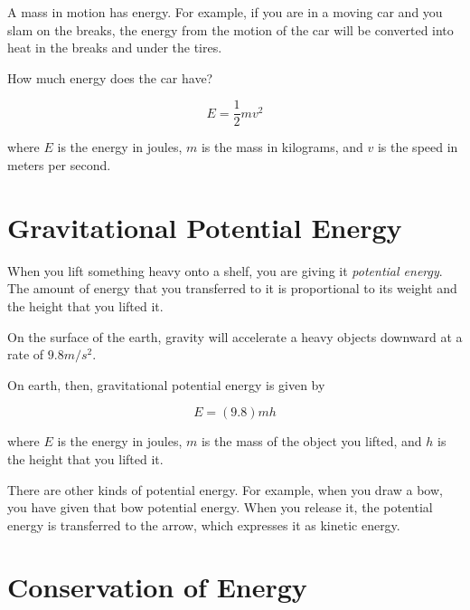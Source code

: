 A mass in motion has energy. For example, if you are in a moving car
and you slam on the breaks, the energy from the motion of the
car will be converted into heat in the breaks and under the tires.

How much energy does the car have?

\begin{mdframed}[style=important, frametitle={Formula for Kinetic Energy}]

$$E = \frac{1}{2} m v^2$$

where $E$ is the energy in joules, $m$ is the mass in kilograms, and
$v$ is the speed in meters per second.

\end{mdframed}

\section{Gravitational Potential Energy}

When you lift something heavy onto a shelf, you are giving it
\textit{potential energy}. The amount of energy that you transferred
to it is proportional to its weight and the height that you lifted it.

On the surface of the earth, gravity will accelerate a heavy objects downward at
a rate of $9.8 m/s^2$.

\begin{mdframed}[style=important, frametitle={Formula for Gravitational Potential Energy}]
On earth, then, gravitational potential energy is given by

$$E = (9.8)mh$$


where $E$ is the energy in joules, $m$ is the mass of the object you
lifted, and $h$ is the height that you lifted it.

\end{mdframed}


There are other kinds of potential energy. For example, when you draw
a bow, you have given that bow potential energy. When you release it,
the potential energy is transferred to the arrow, which expresses it
as kinetic energy.

\section{Conservation of Energy}

